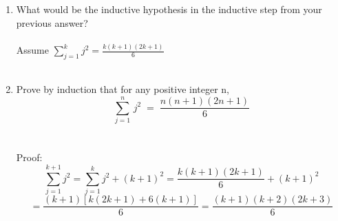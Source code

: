 \documentclass{amsart}
\theoremstyle{definition}
\theoremstyle{Exercise}
\theoremstyle{remark}
\theoremstyle{rule}
\numberwithin{equation}{section}
\begin{document}
\begin{enumerate}[label=(\alph*)]
   \item What would be the inductive hypothesis in the inductive step from your previous answer?\\\\
    Assume \( \sum_{j=1}^k j^2 = \frac{k(k+1)(2k+1)}{6} \)
    \\\\

   \item Prove by induction that for any positive integer n,
   \[\displaystyle \sum_{j=1}^{n}\, j^2 \;=\;\frac{n(n+1)(2n+1)}{6}\] \\\\
    Proof:
    \[ \sum_{j=1}^{k+1} j^2 = \sum_{j=1}^k j^2 + (k+1)^2 = \frac{k(k+1)(2k+1)}{6} + (k+1)^2 \]
    \[ = \frac{(k+1)[k(2k+1) + 6(k+1)]}{6} = \frac{(k+1)(k+2)(2k+3)}{6} \]

\end{enumerate}
\end{document}
